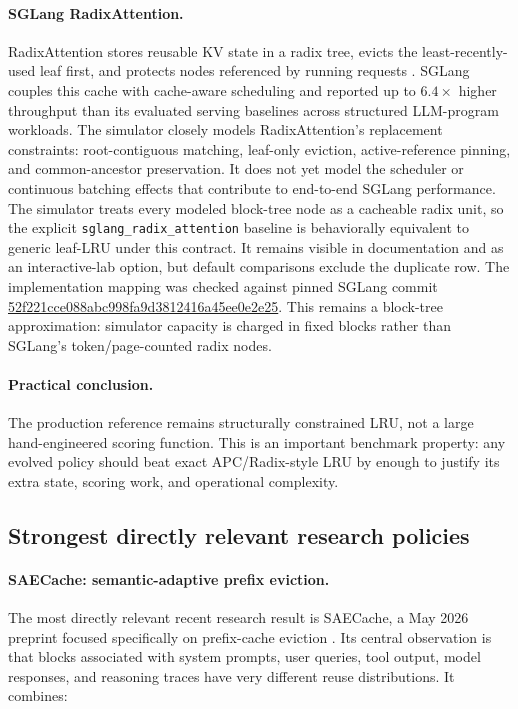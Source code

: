 \documentclass[11pt]{article}
\newcommand{\identifier}[1]{\nolinkurl{#1}}
\begin{document}
\paragraph{SGLang RadixAttention.}
RadixAttention stores reusable KV state in a radix tree, evicts the least-recently-used
leaf first, and protects nodes referenced by running requests
\cite{sglang}.  SGLang couples this cache with cache-aware scheduling and reported up to
\(6.4\times\) higher throughput than its evaluated serving baselines across structured
LLM-program workloads.  The simulator closely models RadixAttention's replacement
constraints: root-contiguous matching, leaf-only eviction, active-reference pinning,
and common-ancestor preservation.  It does not yet model the scheduler or continuous
batching effects that contribute to end-to-end SGLang performance.
The simulator treats every modeled block-tree node as a cacheable radix unit, so the
explicit \identifier{sglang_radix_attention} baseline is behaviorally equivalent to
generic leaf-LRU under this contract.  It remains visible in documentation and as an
interactive-lab option, but default comparisons exclude the duplicate row.  The
implementation mapping was checked against pinned SGLang commit
\href{https://github.com/sgl-project/sglang/tree/52f221cce088abc998fa9d3812416a45ee0e2e25/python/sglang/srt/mem_cache}{52f221cce088abc998fa9d3812416a45ee0e2e25}.
This remains a block-tree approximation: simulator capacity is charged in fixed
blocks rather than SGLang's token/page-counted radix nodes.

\paragraph{Practical conclusion.}
The production reference remains structurally constrained LRU, not a large
hand-engineered scoring function.  This is an important benchmark property: any evolved
policy should beat exact APC/Radix-style LRU by enough to justify its extra state,
scoring work, and operational complexity.

\subsection{Strongest directly relevant research policies}

\paragraph{SAECache: semantic-adaptive prefix eviction.}
The most directly relevant recent research result is SAECache, a May 2026 preprint
focused specifically on prefix-cache eviction \cite{saecache}.  Its central observation
is that blocks associated with system prompts, user queries, tool output, model
responses, and reasoning traces have very different reuse distributions.  It combines:
\end{document}
